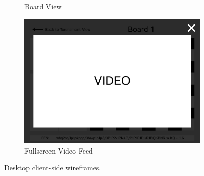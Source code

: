 \begin{figure}[h!]
\begin{subfigure}[h!]{0.40\linewidth}
        \caption{Board View}
        \label{fig:desktop-board-view}
    \end{subfigure}

    \begin{subfigure}[h!]{0.40\linewidth}
        \centering
        \includegraphics[width=\linewidth]{figures/methods/wireframes/desktop-full-screen-video-view.png}
        \caption{Fullscreen Video Feed}
        \label{fig:desktop-fullscreen-video}
    \end{subfigure}
    
    \caption{Desktop client-side wireframes.}
    \label{fig:desktop-view-group}
\end{figure}


